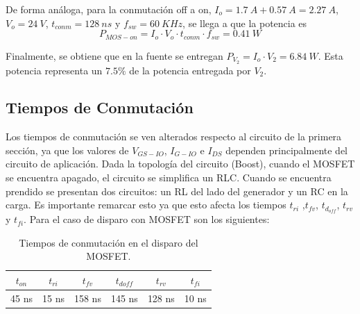 De forma análoga, para la conmutación off a on, $I_o = 1.7 \ A + 0.57 \ A = 2.27 \ A$, $V_o = 24 \ V$, $ t_{conm}= 128 \ ns$ y $f_{sw}=60 \ KHz$, se llega a que la potencia es
\begin{equation}
P_{MOS-on}=I_o \cdot V_o \cdot t_{conm} \cdot f_{sw} = 0.41 \ W
\end{equation}

Finalmente, se obtiene que en la fuente se entregan $P_{V_2}=I_o \cdot V_2 = 6.84 \ W$. Esta potencia representa un $7.5 \%$ de la potencia entregada por $V_2$.

\subsection{Tiempos de Conmutación}
Los tiempos de conmutación se ven alterados respecto al circuito de la primera sección, ya que los valores de $V_{GS-IO}$, $I_{G-IO}$ e $I_{DS}$ dependen principalmente del circuito de aplicación. Dada la topología del circuito (Boost), cuando el MOSFET se encuentra apagado, el circuito se simplifica un RLC. Cuando se encuentra prendido se presentan dos circuitos: un RL del lado del generador y un RC en la carga. Es importante remarcar esto ya que esto afecta los tiempos $t_{ri}$ ,$t_{fv}$, $t_{d_{off}}$, $t_{rv}$ y  $t_{fi}$. Para el caso de disparo con MOSFET son los siguientes:
\begin{table}[H]
\center
\begin{tabular}{cccccc}
\hline
$t_{on}$ & $t_{ri}$ & $t_{fv}$ & $t_{doff}$ & $t_{rv}$ & $t_{fi}$          \\	\hline
45 ns       & 15 ns       & 158 ns      & 145 ns        & 128 ns      & 10 ns     \\	 	\hline
\end{tabular}
\caption{Tiempos de conmutación en el disparo del MOSFET.}
\end{table}


